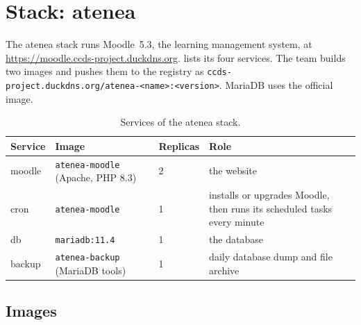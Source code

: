 \section{Stack: atenea}
\label{sec:stack-atenea}

The atenea stack runs Moodle~5.3, the learning management system, at
\url{https://moodle.ccds-project.duckdns.org}.
 lists its four services. The team builds two
images and pushes them to the registry as
\texttt{ccds-project.duckdns.org/atenea-<name>:<version>}. MariaDB uses
the official image.

\begin{table}[htbp]
  \centering
  \caption{Services of the atenea stack.}
  \label{tab:atenea-services}
  \small
  \begin{tabular}{lll>{\raggedright\arraybackslash}p{55mm}}
    \toprule
    Service & Image                                   & Replicas & Role \\
    \midrule
    moodle  & \texttt{atenea-moodle} (Apache, PHP 8.3) & 2 & the website \\
    cron    & \texttt{atenea-moodle}                  & 1 & installs or upgrades Moodle, then runs its
                                                            scheduled tasks every minute \\
    db      & \texttt{mariadb:11.4}                   & 1 & the database \\
    backup  & \texttt{atenea-backup} (MariaDB tools)  & 1 & daily database dump and file archive \\
    \bottomrule
  \end{tabular}
\end{table}

\subsection{Images}


